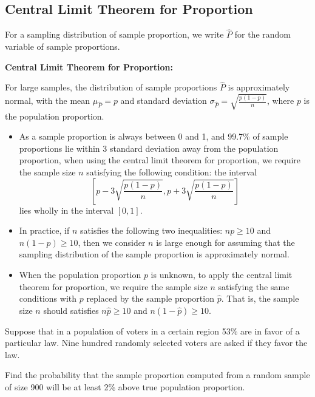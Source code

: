 \hypertarget{central-limit-theorem-for-proportion}{%
\subsection{Central Limit Theorem for
Proportion}\label{central-limit-theorem-for-proportion}}

For a sampling distribution of sample proportion, we write \(\hat{P}\)
for the random variable of sample proportions.

\begin{theorem}

\textbf{Central Limit Theorem for Proportion:}

For large samples, the distribution of sample proportions \(\hat{P}\) is
approximately normal, with the mean \(\mu_{\hat{P}}=p\) and standard
deviation \(\sigma_{\hat{P}}=\sqrt{\frac{p(1-p)}{n}}\), where \(p\) is
the population proportion.

\end{theorem}

\begin{itemize}
\item
  As a sample proportion is always between 0 and 1, and 99.7\% of sample
  proportions lie within 3 standard deviation away from the population
  proportion, when using the central limit theorem for proportion, we
  require the sample size \(n\) satisfying the following condition: the
  interval
  \[\left[p-3\sqrt{\frac{p(1-p)}{n}}, p+3\sqrt{\frac{p(1-p)}{n}}\right]\]
  lies wholly in the interval \([0, 1]\).
\item
  In practice, if \(n\) satisfies the following two inequalities:
  \(np\ge 10\) and \(n(1-p)\ge 10\), then we consider \(n\) is large
  enough for assuming that the sampling distribution of the sample
  proportion is approximately normal.
\item
  When the population proportion \(p\) is unknown, to apply the central
  limit theorem for proportion, we require the sample size \(n\)
  satisfying the same conditions with \(p\) replaced by the sample
  proportion \(\hat{p}\). That is, the sample size \(n\) should
  satisfies \(n\hat{p}\ge 10\) and \(n(1-\hat{p})\ge 10\).
\end{itemize}

\begin{example}

Suppose that in a population of voters in a certain region 53\% are in
favor of a particular law. Nine hundred randomly selected voters are
asked if they favor the law.

Find the probability that the sample proportion computed from a random
sample of size 900 will be at least 2\% above true population
proportion.

\end{example}

